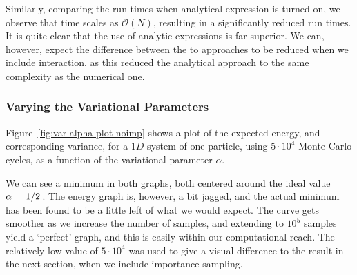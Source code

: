 \documentclass[a4paper, 11pt]{article}
\begin{document}
\begin{multicols}{2}
Similarly, comparing the run times when analytical expression is turned on, we observe
that time scales as $\mathcal{O}(N)$, resulting in a significantly reduced run
times. It is quite clear that the use of analytic expressions is far superior.
We can, however, expect the difference between the to approaches to be reduced
when we include interaction, as this reduced the analytical approach to the same
complexity as the numerical one.




\subsubsection{Varying the Variational Parameters}

Figure~\ref{fig:var-alpha-plot-noimp} shows a plot of the expected energy, and
corresponding variance, for a $1D$ system of one particle, using $5\cdot 10^4$ Monte
Carlo cycles, as a function of the variational parameter $\alpha$.

We can see a minimum in both graphs, both centered around the ideal value
$\alpha=\flatfrac{1}{2}$. The energy graph is, however, a bit jagged, and the
actual minimum has been found to be a little left of what we would expect. The
curve gets smoother as we increase the number of samples, and extending to
$10^5$ samples yield a {\lq perfect\rq} graph, and this is easily within our
computational reach. The relatively low value of $5\cdot 10^4$ was used to give a visual
difference to the result in the next section, when we include importance
sampling.

\end{multicols}
\end{document}
